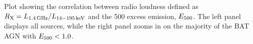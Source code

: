 \label{fig:excess_vs_rx} Plot showing the correlation between radio loudness defined as $R_{\rm X} = L_{\rm 1.4\,GHz}/L_{\rm 14-195\, keV}$ and the 500 \um{} excess emission, $E_{\rm 500}$. The left panel displays all sources, while the right panel zooms in on the majority of the BAT AGN with $E_{\rm 500} < 1.0$.  
  